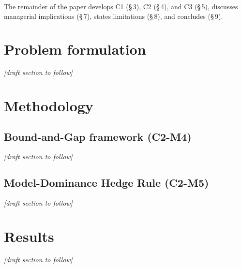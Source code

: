 \documentclass[11pt, a4paper]{article}
\begin{document}
The remainder of the paper develops C1 (\S\,3), C2 (\S\,4), and C3 (\S\,5), discusses managerial implications (\S\,7), states limitations (\S\,8), and concludes (\S\,9).

\section{Problem formulation}\label{sec:problem}
\textit{[draft section to follow]}

\section{Methodology}\label{sec:methodology}

\subsection{Bound-and-Gap framework (C2-M4)}\label{sec:m4}
\textit{[draft section to follow]}

\subsection{Model-Dominance Hedge Rule (C2-M5)}\label{sec:m5}
\textit{[draft section to follow]}

\section{Results}\label{sec:results}
\textit{[draft section to follow]}
\end{document}
